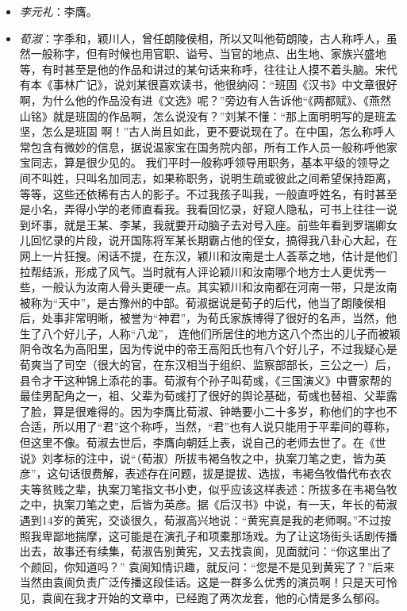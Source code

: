 \documentclass[]{book}
\providecommand{\tightlist}{%
  \setlength{\itemsep}{0pt}\setlength{\parskip}{0pt}}
\begin{document}
\begin{itemize}
\tightlist
\item
  \emph{李元礼}：李膺。
\item
  \emph{荀淑}：字季和，颖川人，曾任朗陵侯相，所以又叫他荀朗陵，古人称呼人，虽然一般称字，但有时候也用官职、谥号、当官的地点、出生地、家族兴盛地等，有时甚至是他的作品和讲过的某句话来称呼，往往让人摸不着头脑。宋代有本《事林广记》，说刘某很喜欢读书，他很纳闷：``班固《汉书》中文章很好啊，为什么他的作品没有进《文选》呢？''旁边有人告诉他``《两都赋》、《燕然山铭》就是班固的作品啊，怎么说没有？''刘某不懂：``那上面明明写的是班孟坚，怎么是班固
  啊！''古人尚且如此，更不要说现在了。在中国，怎么称呼人常包含有微妙的信息，据说温家宝在国务院内部，所有工作人员一般称呼他家宝同志，算是很少见的。
  我们平时一般称呼领导用职务，基本平级的领导之间不叫姓，只叫名加同志，如果称职务，说明生疏或彼此之间希望保持距离，等等，这些还依稀有古人的影子。不过我孩子叫我，一般直呼姓名，有时甚至是小名，弄得小学的老师直看我。我看回忆录，好窥人隐私，可书上往往一说到坏事，就是王某、李某，我就要开动脑子去对号入座。前些年看到罗瑞卿女儿回忆录的片段，说开国陈将军某长期霸占他的侄女，搞得我八卦心大起，在网上一片狂搜。闲话不提，在东汉，颖川和汝南是士人荟萃之地，估计是他们拉帮结派，形成了风气。当时就有人评论颖川和汝南哪个地方士人更优秀一些，一般认为汝南人骨头更硬一点。其实颖川和汝南都在河南一带，只是汝南被称为``天中''，是古豫州的中部。荀淑据说是荀子的后代，他当了朗陵侯相后，处事非常明晰，被誉为``神君''，为荀氏家族博得了很好的名声，当然，他生了八个好儿子，人称``八龙''，
  连他们所居住的地方这八个杰出的儿子而被颖阴令改名为高阳里，因为传说中的帝王高阳氏也有八个好儿子，不过我疑心是荀爽当了司空（很大的官，在东汉相当于组织、监察部部长，三公之一）后，县令才干这种锦上添花的事。荀淑有个孙子叫荀彧，《三国演义》中曹家帮的最佳男配角之一，祖、父辈为荀彧打了很好的舆论基础，荀彧也替祖、父辈露了脸，算是很难得的。因为李膺比荀淑、钟皓要小二十多岁，称他们的字也不合适，所以用了``君''这个称呼，当然，``君''也有人说只能用于平辈间的尊称，但这里不像。荀淑去世后，李膺向朝廷上表，说自己的老师去世了。在《世说》刘孝标的注中，说``（荀淑）所拔韦褐刍牧之中，执案刀笔之吏，皆为英彦''，这句话很费解，表述存在问题，拔是提拔、选拔，韦褐刍牧借代布衣农夫等贫贱之辈，执案刀笔指文书小吏，似乎应该这样表述：所拔多在韦褐刍牧之中，执案刀笔之吏，后皆为英彦。据《后汉书》中说，有一天，年长的荀淑遇到14岁的黄宪，交谈很久，荀淑高兴地说：``黄宪真是我的老师啊。''不过按照我卑鄙地揣摩，这可能是在演孔子和项橐那场戏。为了让这场街头话剧传播出去，故事还有续集，荀淑告别黄宪，又去找袁阆，见面就问：``你这里出了个颜回，你知道吗？''
  袁阆知情识趣，就反问：``您是不是见到黄宪了？''后来当然由袁阆负责广泛传播这段佳话。这是一群多么优秀的演员啊！只是天可怜见，袁阆在我才开始的文章中，已经跑了两次龙套，他的心情是多么郁闷。

\end{itemize}
\end{document}
